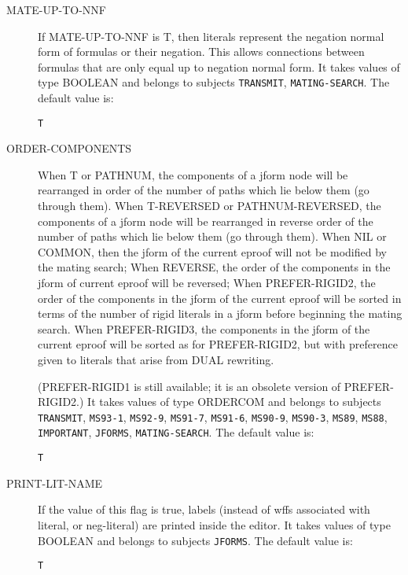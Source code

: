 \begin{description}
\item[MATE-UP-TO-NNF]  
If MATE-UP-TO-NNF is T, then literals represent the
negation normal form of formulas or their negation.
This allows connections between formulas that are
only equal up to negation normal form.
It takes values of type BOOLEAN and belongs to subjects \texttt{TRANSMIT}, \texttt{MATING-SEARCH}.  The default value is: \begin{lstlisting}
T
\end{lstlisting}

\item[ORDER-COMPONENTS]  
When T or PATHNUM, the components of a jform node will be
rearranged in order of the number of paths which lie below them (go 
through them).
When T-REVERSED or PATHNUM-REVERSED, the components of a jform node will be 
rearranged in reverse order of the number of paths which lie below them (go 
through them).
When NIL or COMMON, then the jform of the current eproof will not be modified 
by the mating search;
When REVERSE, the order of the components in the jform of current eproof will 
be reversed;
When PREFER-RIGID2, the order of the components in the jform of the current 
eproof will be sorted in terms of the number of rigid literals in a jform 
before beginning the mating search.
When PREFER-RIGID3, the components in the jform of the current eproof will 
be sorted as for PREFER-RIGID2, but with preference given to literals that 
arise from DUAL rewriting.

(PREFER-RIGID1 is still available; it is an obsolete version of PREFER-RIGID2.)
It takes values of type ORDERCOM and belongs to subjects \texttt{TRANSMIT}, \texttt{MS93-1}, \texttt{MS92-9}, \texttt{MS91-7}, \texttt{MS91-6}, \texttt{MS90-9}, \texttt{MS90-3}, \texttt{MS89}, \texttt{MS88}, \texttt{IMPORTANT}, \texttt{JFORMS}, \texttt{MATING-SEARCH}.  The default value is: \begin{lstlisting}
T
\end{lstlisting}

\item[PRINT-LIT-NAME]  
If the value of this flag is true, labels (instead
 of wffs associated with literal, or neg-literal) are printed inside
 the editor.
It takes values of type BOOLEAN and belongs to subjects \texttt{JFORMS}.  The default value is: \begin{lstlisting}
T
\end{lstlisting}


\end{description}
